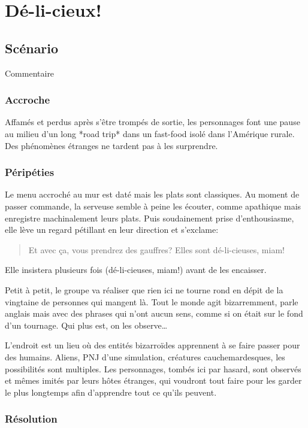 \chapter{Dé-li-cieux!}

\section{Scénario}

Commentaire

\subsection{Accroche}

Affamés et perdus après s'être trompés de sortie, les personnages font une pause au milieu d'un long *road trip* dans un fast-food isolé dans l'Amérique rurale. Des phénomènes étranges ne tardent pas à les surprendre.

\subsection{Péripéties}

Le menu accroché au mur est daté mais les plats sont classiques. Au moment de passer commande, la serveuse semble à peine les écouter, comme apathique mais enregistre machinalement leurs plats. Puis soudainement prise d'enthousiasme, elle lève un regard pétillant en leur direction et s'exclame:

\blockquote{Et avec ça, vous prendrez des gauffres? Elles sont dé-li-cieuses, miam!}

Elle insistera plusieurs fois (dé-li-cieuses, miam!) avant de les encaisser.

Petit à petit, le groupe va réaliser que rien ici ne tourne rond en dépit de la vingtaine de personnes qui mangent là. Tout le monde agit bizarremment, parle \og anglais \fg mais avec des phrases qui n'ont aucun sens, comme si on était sur le fond d'un tournage. Qui plus est, on les observe…

L'endroit est un lieu où des entités bizarroïdes apprennent à se faire passer pour des humains. Aliens, PNJ d'une simulation, créatures cauchemardesques, les possibilités sont multiples. Les personnages, tombés ici par hasard, sont observés et mêmes imités par leurs hôtes étranges, qui voudront tout faire pour les garder le plus longtemps afin d'apprendre tout ce qu'ils peuvent.

\subsection{Résolution}

